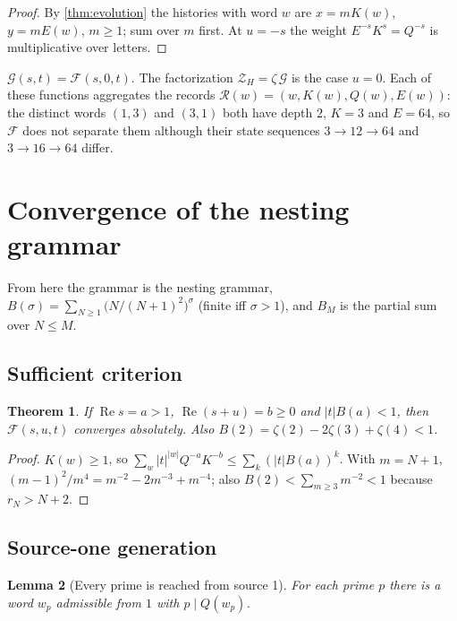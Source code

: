 \documentclass[11pt,a4paper]{article}
\newtheorem{theorem}{Theorem}[section]
\newtheorem{lemma}[theorem]{Lemma}
\begin{document}
\begin{proof}

By \cref{thm:evolution} the histories with word \(w\) are \(x=mK(w)\), \(y=mE(w)\),
\(m\ge1\); sum over \(m\) first. At \(u=-s\) the weight
\(E^{-s}K^{s}=Q^{-s}\) is multiplicative over letters.

\end{proof}

\(\mathcal G(s,t)=\mathcal F(s,0,t)\). The factorization
\(\mathcal Z_H=\zeta\,\mathcal G\) is the case \(u=0\). Each of these
functions aggregates the records \(\mathcal R(w)=(w,K(w),Q(w),E(w))\):
the distinct words \((1,3)\) and \((3,1)\) both have depth \(2\),
\(K=3\) and \(E=64\), so \(\mathcal F\) does not separate them although
their state sequences \(3\to12\to64\) and \(3\to16\to64\) differ.

\section{Convergence of the nesting
grammar}

From here the grammar is the nesting grammar,
\(B(\sigma)=\sum_{N\ge1}\big(N/(N+1)^2\big)^{\sigma}\) (finite iff
\(\sigma>1\)), and \(B_M\) is the partial sum over \(N\le M\).

\subsection{Sufficient criterion}

\begin{theorem}\label{thm:suff}
If \(\operatorname{Re}s=a>1\), \(\operatorname{Re}(s+u)=b\ge0\) and
\(|t|B(a)<1\), then \(\mathcal F(s,u,t)\) converges absolutely. Also
\(B(2)=\zeta(2)-2\zeta(3)+\zeta(4)<1\).

\end{theorem}

\begin{proof}

\(K(w)\ge1\), so \(\sum_w|t|^{|w|}Q^{-a}K^{-b}\le\sum_k(|t|B(a))^k\).
With \(m=N+1\), \((m-1)^2/m^4=m^{-2}-2m^{-3}+m^{-4}\); also
\(B(2)<\sum_{m\ge3}m^{-2}<1\) because \(r_N>N+2\).

\end{proof}

\subsection{Source-one generation}

\begin{lemma}[Every prime is reached from source 1]\label{lem:primes}
For each prime \(p\) there is a word \(w_p\) admissible from \(1\) with
\(p\mid Q(w_p)\).

\end{lemma}
\end{document}
